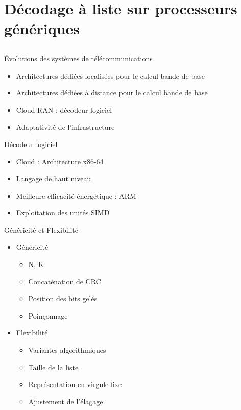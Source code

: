 \section[Décodeur logiciel à liste]{Décodage à liste sur processeurs génériques}
\subsection*{}

\begin{frame}[c]{\'Evolutions des systèmes de télécommunications}
	\begin{itemize}
		\item<1-> Architectures dédiées localisées pour le calcul bande de base
		\item<2-> Architectures dédiées à distance pour le calcul bande de base
		\item<3-> Cloud-RAN : décodeur logiciel
		\item<4-> Adaptativité de l'infrastructure
	\end{itemize}
\end{frame}

\begin{frame}[c]{Décodeur logiciel}
	\begin{itemize}
		\vfill
		\item Cloud : Architecture x86-64
		\vfill
		\item Langage de haut niveau
		\vfill
		\item Meilleure efficacité énergétique : ARM
		\vfill
		\item Exploitation des unités SIMD
		\vfill
	\end{itemize}
\end{frame}

\begin{frame}[c]{Généricité et Flexibilité}
	\begin{itemize}
		\item Généricité
		\begin{itemize}
			\item N, K
			\item Concaténation de CRC
			\item Position des bits gelés
			\item Poinçonnage
		\end{itemize}
		\item Flexibilité
		\begin{itemize}
			\item Variantes algorithmiques
			\item Taille de la liste
			\item Représentation en virgule fixe
			\item Ajustement de l'élagage
		\end{itemize}
	\end{itemize}
\end{frame}


